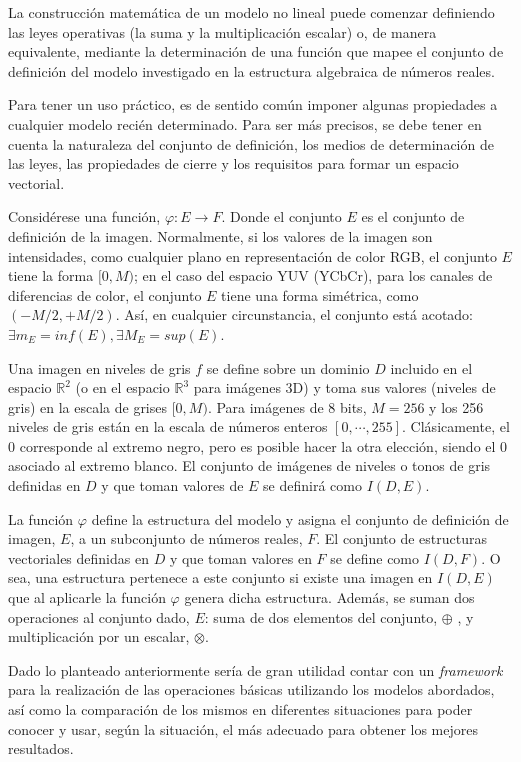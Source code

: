 La construcción matemática de un modelo no lineal puede comenzar definiendo las leyes operativas (la suma y la multiplicación escalar) o, de manera equivalente, mediante la determinación de una función que mapee el conjunto de definición del modelo investigado en la estructura algebraica de números reales.

Para tener un uso práctico, es de sentido común imponer algunas propiedades a cualquier modelo recién determinado. Para ser más precisos, se debe tener en cuenta la naturaleza del conjunto de definición, los medios de determinación de las leyes, las propiedades de cierre y los requisitos para formar un espacio vectorial. 

Consid\'erese una función, $\varphi : E \rightarrow F$. Donde el conjunto $E$ es el conjunto de definición de la imagen. Normalmente, si los valores de la imagen son intensidades, como cualquier plano en representación de color RGB, el conjunto $E$ tiene la forma $[0,M)$; en el caso del espacio YUV (YCbCr), para los canales de diferencias de color, el conjunto $E$ tiene una forma simétrica, como $( - M/2 , + M/2 )$. Así, en cualquier circunstancia, el conjunto está acotado: $\exists m_E=inf(E),\exists M_E=sup(E)$.

Una imagen en niveles de gris $f$ se define sobre un dominio $D$ incluido en el espacio $\mathbb{R}^2$ (o en el espacio $\mathbb{R}^3$  para imágenes 3D) y toma sus valores (niveles de gris) en la escala de grises $[0, M)$. Para imágenes de 8 bits, $ M = 256$ y los 256 niveles de gris están en la escala de números enteros $[0,\cdots, 255]$. Clásicamente, el 0 corresponde al extremo negro, pero es posible hacer la otra elección, siendo el 0 asociado al extremo blanco. El conjunto de imágenes de niveles o tonos de gris definidas en $D$ y que toman valores de $E$ se definir\'a como $I(D,E)$.

La función $\varphi$ define la estructura del modelo y asigna el conjunto de definición de imagen, $E$, a un subconjunto de números reales, $F$. El conjunto de estructuras vectoriales definidas en $D$ y que toman valores en $F$ se define como $I(D,F)$. O sea, una estructura pertenece a este conjunto si existe una imagen en $I(D,E)$ que al aplicarle la funci\'on $\varphi$ genera dicha estructura. Además, se suman dos operaciones al conjunto dado, $E$: suma de dos elementos del conjunto, $\oplus$ , y multiplicación por un escalar, $\otimes$.  

Dado lo planteado anteriormente ser\'ia de gran utilidad contar con un \textit{framework} para la realizaci\'on de las operaciones b\'asicas utilizando los modelos abordados, as\'i como la comparaci\'on de los mismos en diferentes situaciones para poder conocer y usar, seg\'un la situaci\'on, el m\'as adecuado para obtener los mejores resultados.

